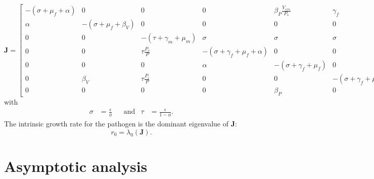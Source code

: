 \documentclass{article}
\newcommand{\mat}[1]{\mathbf{#1}}
\begin{document}
\begin{equation}
  \mat{J} =
  \begin{bmatrix}
    - \left(\sigma + \mu_f + \alpha\right)
    &
    0
    &
    0
    &
    0
    &
    \beta_P \frac{V_{sfs}}{P_s}
    &
    \gamma_f
    &
    \tau \frac{V_{sm}}{P}
    \\
    \alpha
    &
    - \left(\sigma + \mu_f + \beta_V\right)
    &
    0
    &
    0
    &
    0
    &
    0
    &
    0
    \\
    0
    &
    0
    &
    - \left(\tau + \gamma_m + \mu_m\right)
    &
    \sigma
    &
    \sigma
    &
    \sigma
    &
    0
    \\
    0
    &
    0
    &
    \tau \frac{P_s}{P}
    &
    - \left(\sigma + \gamma_f + \mu_f + \alpha\right)
    &
    0
    &
    0
    &
    0
    \\
    0
    &
    0
    &
    0
    &
    \alpha
    &
    - \left(\sigma + \gamma_f + \mu_f\right)
    &
    0
    &
    0
    \\
    0
    &
    \beta_V
    &
    \tau \frac{P_i}{P}
    &
    0
    &
    0
    &
    - \left(\sigma + \gamma_f + \mu_f\right)
    &
    0
    \\
    0
    &
    0
    &
    0
    &
    0
    &
    \beta_P
    &
    0
    &
    0
  \end{bmatrix},
\end{equation}
\endgroup
with
\begin{align}
  \sigma &= \frac{\epsilon}{\phi}
  & & \text{and} &
  \tau &= \frac{\epsilon}{1 - \phi}.
\end{align}
The intrinsic growth rate for the pathogen is the dominant eigenvalue
of $\mat{J}$:
\begin{equation}
  r_0 = \lambda_0(\mat{J}).
\end{equation}

\section{Asymptotic analysis}
\end{document}
